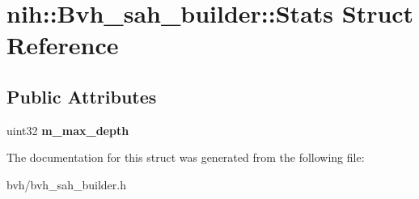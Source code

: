 \hypertarget{structnih_1_1_bvh__sah__builder_1_1_stats}{
\section{nih\-:\-:\-Bvh\-\_\-sah\-\_\-builder\-:\-:\-Stats \-Struct \-Reference}
\label{structnih_1_1_bvh__sah__builder_1_1_stats}
}
\subsection*{\-Public \-Attributes}
\begin{DoxyCompactItemize}
\item 
\hypertarget{structnih_1_1_bvh__sah__builder_1_1_stats_a6aa743ce80a25c76d3bb6e060f882cf1}{
uint32 {\bfseries m\-\_\-max\-\_\-depth}}
\label{structnih_1_1_bvh__sah__builder_1_1_stats_a6aa743ce80a25c76d3bb6e060f882cf1}

\end{DoxyCompactItemize}


\-The documentation for this struct was generated from the following file\-:\begin{DoxyCompactItemize}
\item 
bvh/bvh\-\_\-sah\-\_\-builder.\-h\end{DoxyCompactItemize}
